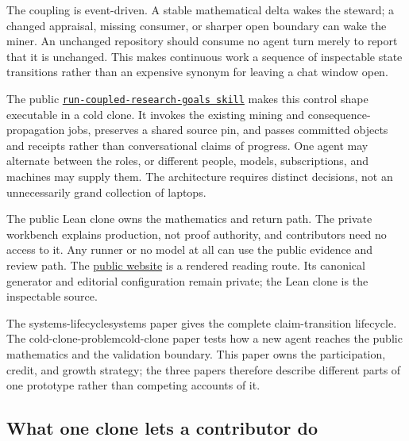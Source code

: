 \documentclass[10pt]{article}
\newcommand{\repobase}{https://github.com/wcook04/plectis-erdos}
\newcommand{\repolink}[2]{\href{\repobase/blob/402497d8e1ae025518ee34190664e8f67aa40f93/#1}{\texttt{#2}}}
\begin{document}
The coupling is event-driven.  A stable mathematical delta wakes the steward;
a changed appraisal, missing consumer, or sharper open boundary can wake the
miner.  An unchanged repository should consume no agent turn merely to report
that it is unchanged.  This makes continuous work a sequence of inspectable
state transitions rather than an expensive synonym for leaving a chat window
open.

The public \repolink{skills/run-coupled-research-goals/SKILL.md}%
{run-coupled-research-goals skill} makes this control shape executable in a
cold clone.  It invokes the existing mining and consequence-propagation jobs,
preserves a shared source pin, and passes committed objects and receipts rather
than conversational claims of progress.  One agent may alternate between the
roles, or different people, models, subscriptions, and machines may supply
them.  The architecture requires distinct decisions, not an unnecessarily
grand collection of laptops.

The public Lean clone owns the mathematics and return path. The private
workbench explains production, not proof authority, and contributors need no
access to it. Any runner or no model at all can use the public evidence and
review path.
The \href{https://wcook04.github.io/practical-formal-verification/maths/}{public website} is a
rendered reading route. Its canonical generator and editorial configuration
remain private; the Lean clone is the inspectable source.

The %
{systems-lifecycle}{systems paper} gives the complete claim-transition
lifecycle. The %
{cold-clone-problem}{cold-clone paper} tests how a new agent reaches the public
mathematics and the validation boundary. This paper owns the participation,
credit, and growth strategy; the three papers therefore describe different
parts of one prototype rather than competing accounts of it.

\subsection*{What one clone lets a contributor do}
\end{document}
